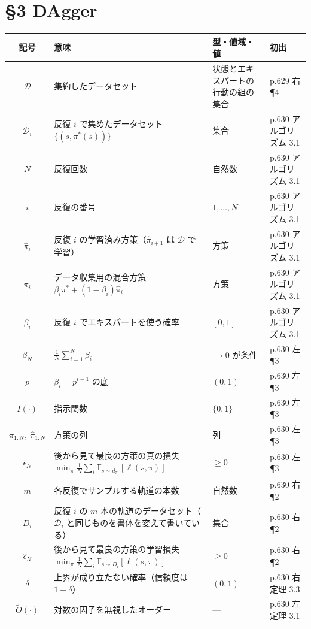 \documentclass[a4paper,10pt]{ltjsarticle}
\newcommand{\note}[1]{\textcolor{red!70!black}{#1}}
\newcommand{\E}{\mathbb{E}}
\newenvironment{symtab}{%
  \par\noindent\begin{tabular}{SMTP}
  \toprule
  記号 & 意味 & 型・値域・値 & 初出 \\
  \midrule
}{\bottomrule\end{tabular}\par\medskip}
\begin{document}
\section{§3 DAgger}
\begin{symtab}
$\mathcal{D}$ & 集約したデータセット & 状態とエキスパートの行動の組の集合 & p.629 右 ¶4 \\
$\mathcal{D}_i$ & 反復 $i$ で集めたデータセット $\{(s,\pi^*(s))\}$ & 集合 & p.630 アルゴリズム 3.1 \\
$N$ & 反復回数 & 自然数 & p.630 アルゴリズム 3.1 \\
$i$ & 反復の番号 & $1,\dots,N$ & p.630 アルゴリズム 3.1 \\
$\hat\pi_i$ & 反復 $i$ の学習済み方策（$\hat\pi_{i+1}$ は $\mathcal{D}$ で学習） & 方策 & p.630 アルゴリズム 3.1 \\
$\pi_i$ & データ収集用の混合方策 $\beta_i\pi^*+(1-\beta_i)\hat\pi_i$ & 方策 & p.630 アルゴリズム 3.1 \\
$\beta_i$ & 反復 $i$ でエキスパートを使う確率 & $[0,1]$ & p.630 アルゴリズム 3.1 \\
$\bar\beta_N$ & $\frac1N\sum_{i=1}^N\beta_i$ & $\to 0$ が条件 & p.630 左 ¶3 \\
$p$ & $\beta_i = p^{i-1}$ の底 & $(0,1)$ & p.630 左 ¶3 \\
$I(\cdot)$ & 指示関数 & $\{0,1\}$ & p.630 左 ¶3 \\
$\pi_{1:N},\ \hat\pi_{1:N}$ & 方策の列 & 列 & p.630 左 ¶3 \\
$\epsilon_N$ & 後から見て最良の方策の真の損失 $\min_{\pi}\frac1N\sum_i\E_{s\sim d_{\pi_i}}[\ell(s,\pi)]$ & $\ge 0$ & p.630 左 ¶3 \\
$m$ & 各反復でサンプルする軌道の本数 & 自然数 & p.630 右 ¶2 \\
$D_i$ & 反復 $i$ の $m$ 本の軌道のデータセット\note{（$\mathcal{D}_i$ と同じものを書体を変えて書いている）} & 集合 & p.630 右 ¶2 \\
$\hat\epsilon_N$ & 後から見て最良の方策の学習損失 $\min_{\pi}\frac1N\sum_i\E_{s\sim D_i}[\ell(s,\pi)]$ & $\ge 0$ & p.630 右 ¶2 \\
$\delta$ & 上界が成り立たない確率（信頼度は $1-\delta$） & $(0,1)$ & p.630 右 定理 3.3 \\
$\tilde O(\cdot)$ & 対数の因子を無視したオーダー & --- & p.630 左 定理 3.1 \\
\end{symtab}

\end{document}
